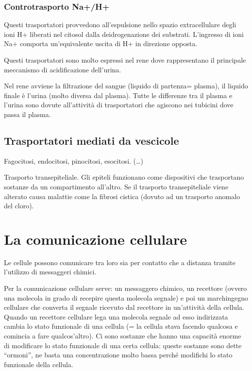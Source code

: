 \documentclass[]{article}
\begin{document}
\subsubsection{Controtrasporto Na+/H+}\label{controtrasporto-nah}

Questi trasportatori provvedono all'espulsione nello spazio
extracellulare degli ioni H+ liberati nel citosol dalla deidrogenazione
dei substrati. L'ingresso di ioni Na+ comporta un'equivalente uscita di
H+ in direzione opposta.

Questi trasportatori sono molto espressi nel rene dove rappresentano il
principale meccanismo di acidificazione dell'urina.

Nel rene avviene la filtrazione del sangue (liquido di partenza=
plasma), il liquido finale è l'urina (molto diversa dal plasma). Tutte
le differenze tra il plasma e l'urina sono dovute all'attività di
trasportatori che agiscono nei tubicini dove passa il plasma.

\subsection{Trasportatori mediati da
vescicole}\label{trasportatori-mediati-da-vescicole}

Fagocitosi, endocitosi, pinocitosi, esocitosi. (\ldots{})

Trasporto transepiteliale. Gli epiteli funzionano come dispositivi che
trasportano sostanze da un compartimento all'altro. Se il trasporto
transepiteliale viene alterato causa malattie come la fibrosi cistica
(dovuto ad un trasporto anomalo del cloro).

\section{La comunicazione cellulare}\label{la-comunicazione-cellulare}

Le cellule possono comunicare tra loro sia per contatto che a distanza
tramite l'utilizzo di messaggeri chimici.

Per la comunicazione cellulare serve: un messaggero chimico, un
recettore (ovvero una molecola in grado di recepire questa molecola
segnale) e poi un marchingegno cellulare che converta il segnale
ricevuto dal recettore in un'attività della cellula. Quando un recettore
cellulare lega una molecola segnale ad esso indirizzata cambia lo stato
funzionale di una cellula (= la cellula stava facendo qualcosa e
comincia a fare qualcos'altro). Ci sono sostanze che hanno una capacità
enorme di modificare lo stato funzionale di una certa cellula: queste
sostanze sono dette ``ormoni'', ne basta una concentrazione molto bassa
perché modifichi lo stato funzionale della cellula.
\end{document}
